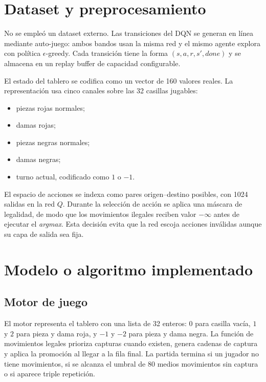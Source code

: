 \documentclass[11pt,a4paper]{article}
\begin{document}
\section{Dataset y preprocesamiento}

No se empleó un dataset externo. Las transiciones del DQN se generan en línea mediante auto-juego: ambos bandos usan la misma red y el mismo agente explora con política $\epsilon$-greedy. Cada transición tiene la forma $(s,a,r,s',\textit{done})$ y se almacena en un replay buffer de capacidad configurable.

El estado del tablero se codifica como un vector de 160 valores reales. La representación usa cinco canales sobre las 32 casillas jugables:

\begin{itemize}
    \item piezas rojas normales;
    \item damas rojas;
    \item piezas negras normales;
    \item damas negras;
    \item turno actual, codificado como $1$ o $-1$.
\end{itemize}

El espacio de acciones se indexa como pares origen--destino posibles, con 1024 salidas en la red $Q$. Durante la selección de acción se aplica una máscara de legalidad, de modo que los movimientos ilegales reciben valor $-\infty$ antes de ejecutar el \textit{argmax}. Esta decisión evita que la red escoja acciones inválidas aunque su capa de salida sea fija.

\section{Modelo o algoritmo implementado}

\subsection{Motor de juego}

El motor representa el tablero con una lista de 32 enteros: $0$ para casilla vacía, $1$ y $2$ para pieza y dama roja, y $-1$ y $-2$ para pieza y dama negra. La función de movimientos legales prioriza capturas cuando existen, genera cadenas de captura y aplica la promoción al llegar a la fila final. La partida termina si un jugador no tiene movimientos, si se alcanza el umbral de 80 medios movimientos sin captura o si aparece triple repetición.
\end{document}
